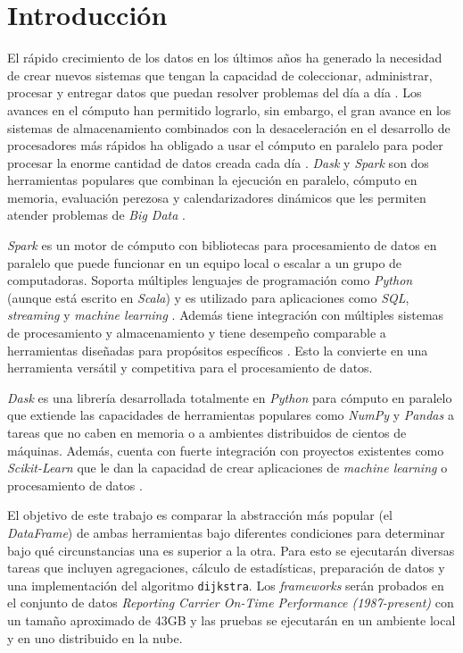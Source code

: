 \chapter*{Introducción}


\noindent El rápido crecimiento de los datos en los últimos años ha generado la necesidad de crear nuevos sistemas que tengan la capacidad de coleccionar, administrar, procesar y entregar datos que puedan resolver problemas del día a día \cite{seagate}. Los avances en el cómputo han permitido lograrlo, sin embargo, el gran avance en los sistemas de almacenamiento combinados con la desaceleración en el desarrollo de procesadores más rápidos ha obligado a usar el cómputo en paralelo para poder procesar la enorme cantidad de datos creada cada día \cite{sparkguide}. \textit{Dask} y \textit{Spark} son dos herramientas populares que combinan la ejecución en paralelo, cómputo en memoria, evaluación perezosa y calendarizadores dinámicos que les permiten atender problemas de \textit{Big Data} \cite{dask-spark-neuroimaging}.

\textit{Spark} es un motor de cómputo con bibliotecas para procesamiento de datos en paralelo que puede funcionar en un equipo local o escalar a un grupo de computadoras. Soporta múltiples lenguajes de programación como \textit{Python} (aunque está escrito en \textit{Scala}) y es utilizado para aplicaciones como \textit{SQL}, \textit{streaming} y \textit{machine learning} \cite{sparkguide}. Además tiene integración con múltiples sistemas de procesamiento y almacenamiento y tiene desempeño comparable a herramientas diseñadas para propósitos específicos \cite{sparkberkeley}. Esto la convierte en una herramienta versátil y competitiva para el procesamiento de datos. 

\textit{Dask} es una librería desarrollada totalmente en \textit{Python} para cómputo en paralelo que extiende las capacidades de herramientas populares como \textit{NumPy} y \textit{Pandas} a tareas que no caben en memoria o a ambientes distribuidos de cientos de máquinas. Además, cuenta con fuerte integración con proyectos existentes como \textit{Scikit-Learn} que le dan la capacidad de crear aplicaciones de \textit{machine learning} o procesamiento de datos \cite{daskdocs}.

El objetivo de este trabajo es comparar la abstracción más popular (el \textit{DataFrame}) de ambas herramientas bajo diferentes condiciones para determinar bajo qué circunstancias una es superior a la otra. Para esto se ejecutarán diversas tareas que incluyen agregaciones, cálculo de estadísticas, preparación de datos y una implementación del algoritmo \texttt{dijkstra}. Los \textit{frameworks} serán probados en el conjunto de datos \textit{Reporting Carrier On-Time Performance (1987-present)} con un tamaño aproximado de 43GB y las pruebas se ejecutarán en un ambiente local y en uno distribuido en la nube.

